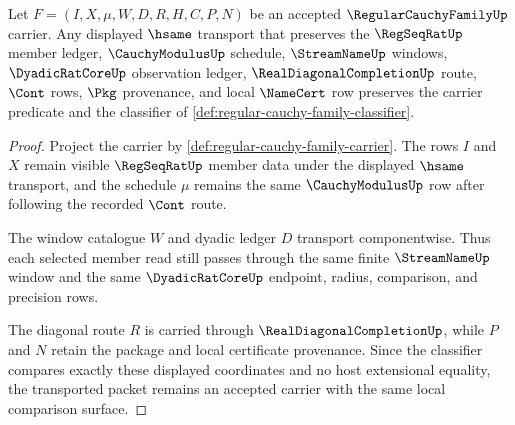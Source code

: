 \begin{theorem}
\label{thm:regular-cauchy-family-carrier-transport-stability}
Let $F=(I,X,\mu,W,D,R,H,C,P,N)$ be an accepted $\RegularCauchyFamilyUp$ carrier. Any displayed $\hsame$ transport that preserves the $\RegSeqRatUp$ member ledger, $\CauchyModulusUp$ schedule, $\StreamNameUp$ windows, $\DyadicRatCoreUp$ observation ledger, $\RealDiagonalCompletionUp$ route, $\Cont$ rows, $\Pkg$ provenance, and local $\NameCert$ row preserves the carrier predicate and the classifier of \autoref{def:regular-cauchy-family-classifier}.
\end{theorem}
\begin{proof}
Project the carrier by \autoref{def:regular-cauchy-family-carrier}. The rows $I$ and $X$ remain visible $\RegSeqRatUp$ member data under the displayed $\hsame$ transport, and the schedule $\mu$ remains the same $\CauchyModulusUp$ row after following the recorded $\Cont$ route.

The window catalogue $W$ and dyadic ledger $D$ transport componentwise. Thus each selected member read still passes through the same finite $\StreamNameUp$ window and the same $\DyadicRatCoreUp$ endpoint, radius, comparison, and precision rows.

The diagonal route $R$ is carried through $\RealDiagonalCompletionUp$, while $P$ and $N$ retain the package and local certificate provenance. Since the classifier compares exactly these displayed coordinates and no host extensional equality, the transported packet remains an accepted carrier with the same local comparison surface.
\end{proof}

